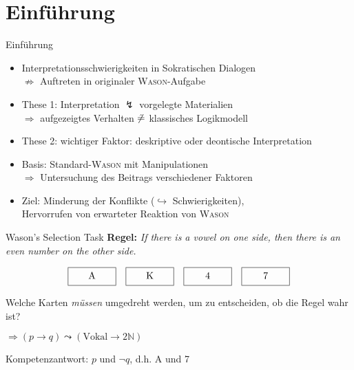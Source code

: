 
{
    \section{Einführung}
}

\begin{frame}{Einführung {\scriptsize \cite[S.~93-95]{stenningHumanReasoningCognitive2008}}}
    \begin{itemize}
        \item Interpretationsschwierigkeiten in Sokratischen Dialogen \\
            $\not \Rightarrow$ Auftreten in originaler \textsc{Wason}-Aufgabe

        \item These 1: Interpretation $\lightning$ vorgelegte Materialien \\
            $\Rightarrow$ aufgezeigtes Verhalten $\centernot {\hat=}$ klassisches Logikmodell

        \item These 2: wichtiger Faktor: deskriptive oder deontische Interpretation

        \item Basis: Standard-\textsc{Wason} mit \alert{Manipulationen} \\
            $\Rightarrow$ Untersuchung des Beitrags verschiedener Faktoren
        
        \item Ziel: Minderung der Konflikte ($\hookrightarrow$ Schwierigkeiten), \\
            Hervorrufen von erwarteter Reaktion von \textsc{Wason}
    \end{itemize}
\end{frame}


\begin{frame}{Wason's Selection Task {\scriptsize \cite[S.~44-46]{stenningHumanReasoningCognitive2008}}}
    \textbf{Regel:} \emph{If there is a vowel on one side, then there is an even number on the other side.}

    \[
        \framebox[5em][c]{A\strut}\quad
        \framebox[5em][c]{K\strut}\quad
        \framebox[5em][c]{4\strut}\quad
        \framebox[5em][c]{7\strut}
    \]

    Welche Karten \emph{müssen} umgedreht werden, um zu entscheiden, ob die Regel wahr ist?

    $\Rightarrow (p \to q) \leadsto (\text{Vokal} \to 2\mathbb{N})$

    Kompetenzantwort: $p$ und $\lnot q$, d.h. A und 7
\end{frame}

